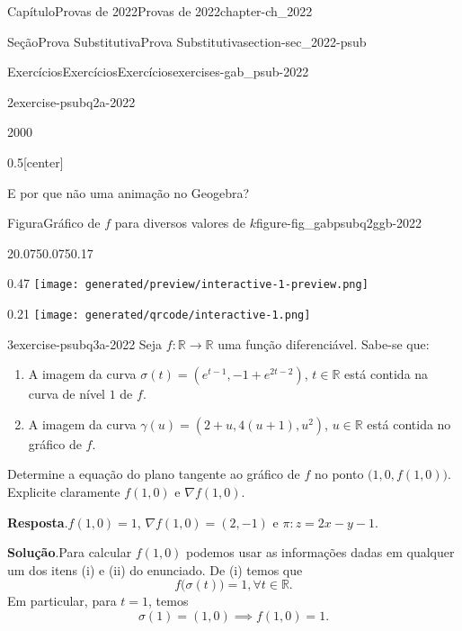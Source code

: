 \documentclass[oneside,10pt,]{book}
\newcommand{\blocktitlefont}{\relax}
\numberwithin{equation}{section}
\newcommand{\R}{\mathbb R}
\begin{document}
\begin{chapterptx}{Capítulo}{Provas de 2022}{}{Provas de 2022}{}{}{chapter-ch_2022}
\begin{sectionptx}{Seção}{Prova Substitutiva}{}{Prova Substitutiva}{}{}{section-sec_2022-psub}
\begin{exercises-subsection-numberless}{Exercícios}{Exercícios}{}{Exercícios}{}{}{exercises-gab_psub-2022}
\begin{divisionexercise}{2}{}{}{exercise-psubq2a-2022}
\begin{sidebyside}{2}{0}{0}{0}
\begin{sbspanel}{0.5}[center]
\end{sbspanel}%
\end{sidebyside}%
\par
E por que não uma animação no Geogebra?%
\begin{figureptx}{Figura}{Gráfico de \(f\) para diversos valores de \(k\)}{figure-fig_gabpsubq2ggb-2022}{}%
\begin{sidebyside}{2}{0.075}{0.075}{0.17}%
\begin{sbspanel}{0.47}%
\texttt{[image: generated/preview/interactive-1-preview.png]}
\end{sbspanel}%
\begin{sbspanel}{0.21}%
\texttt{[image: generated/qrcode/interactive-1.png]}
\end{sbspanel}%
\end{sidebyside}%
\tcblower
\end{figureptx}%
\end{divisionexercise}%
\begin{divisionexercise}{3}{}{}{exercise-psubq3a-2022}%
Seja \(f\colon\R\to\R\) uma função diferenciável. Sabe-se que:%
\begin{enumerate}[label=(\roman*)]
\item{}A imagem da curva \(\sigma(t)=(e^{t-1}, -1 +
e^{2t-2})\), \(t\in\R\) está contida na curva de nível \(1\) de \(f\).%
\item{}A imagem da curva \(\gamma(u) = (2+u, 4(u+1), u^2)\), \(u\in\R\) está contida no gráfico de \(f\).%
\end{enumerate}
%
\par
Determine a equação do plano tangente ao gráfico de \(f\) no ponto \(\big(1,0,f(1,0)\big)\). Explicite claramente \(f(1,0)\) e \(\nabla f(1,0)\).%
\par\smallskip%
\noindent\textbf{\blocktitlefont Resposta}.\hypertarget{answer-psubq3a-2022-b}{}\quad{}\(f(1,0)=1\), \(\nabla f(1,0)=(2,-1)\) e \(\pi\colon
z=2x-y-1\).%
\par\smallskip%
\noindent\textbf{\blocktitlefont Solução}.\hypertarget{solution-psubq3a-2022-c}{}\quad{}Para calcular \(f(1,0)\) podemos usar as informações dadas em qualquer um dos itens (i) e (ii) do enunciado. De (i) temos que%
\begin{equation*}
f\big(\sigma(t)\big) = 1, \forall t \in \mathbb{R}.
\end{equation*}
Em particular, para \(t=1\), temos%
\begin{equation*}
\sigma(1) = (1,0)
\implies \boxed{f(1,0) = 1}.
\end{equation*}

\end{divisionexercise}
\end{exercises-subsection-numberless}
\end{sectionptx}
\end{chapterptx}
\end{document}
